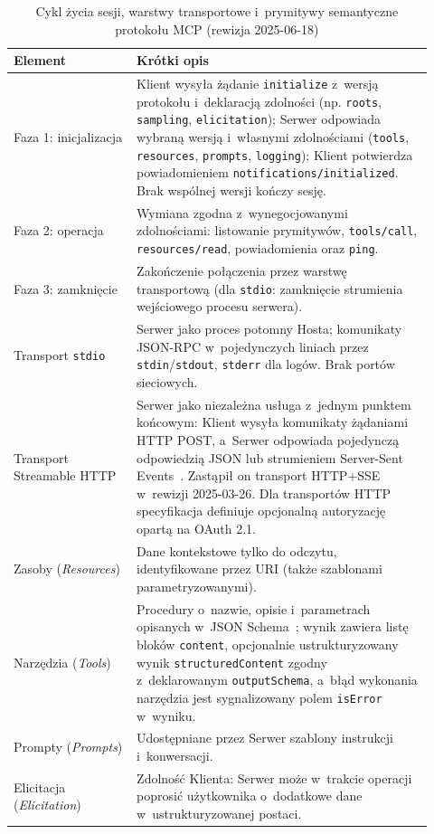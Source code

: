 \begin{table}[htbp]
\centering
\small
\caption{Cykl życia sesji, warstwy transportowe i~prymitywy semantyczne protokołu MCP (rewizja 2025-06-18)}
\label{tab:mcp_sesja_transport_prymitywy}
\begin{tabular}{>{\raggedright\arraybackslash}p{0.27\linewidth} >{\raggedright\arraybackslash}p{0.65\linewidth}}
\toprule
\textbf{Element} & \textbf{Krótki opis} \\
\midrule
Faza 1: inicjalizacja & Klient wysyła żądanie \texttt{initialize} z~wersją protokołu i~deklaracją zdolności (np. \texttt{roots}, \texttt{sampling}, \texttt{elicitation}); Serwer odpowiada wybraną wersją i~własnymi zdolnościami (\texttt{tools}, \texttt{resources}, \texttt{prompts}, \texttt{logging}); Klient potwierdza powiadomieniem \texttt{notifications/initialized}. Brak wspólnej wersji kończy sesję. \\
Faza 2: operacja & Wymiana zgodna z~wynegocjowanymi zdolnościami: listowanie prymitywów, \texttt{tools/call}, \texttt{resources/read}, powiadomienia oraz \texttt{ping}. \\
Faza 3: zamknięcie & Zakończenie połączenia przez warstwę transportową (dla \texttt{stdio}: zamknięcie strumienia wejściowego procesu serwera). \\
\midrule
Transport \texttt{stdio} & Serwer jako proces potomny Hosta; komunikaty JSON-RPC w~pojedynczych liniach przez \texttt{stdin}/\texttt{stdout}, \texttt{stderr} dla logów. Brak portów sieciowych. \\
Transport Streamable HTTP & Serwer jako niezależna usługa z~jednym punktem końcowym: Klient wysyła komunikaty żądaniami HTTP POST, a~Serwer odpowiada pojedynczą odpowiedzią JSON lub strumieniem Server-Sent Events~\cite{w3c_sse}. Zastąpił on transport HTTP+SSE w~rewizji 2025-03-26. Dla transportów HTTP specyfikacja definiuje opcjonalną autoryzację opartą na OAuth 2.1. \\
\midrule
Zasoby (\emph{Resources}) & Dane kontekstowe tylko do odczytu, identyfikowane przez URI (także szablonami parametryzowanymi). \\
Narzędzia (\emph{Tools}) & Procedury o~nazwie, opisie i~parametrach opisanych w~JSON Schema~\cite{json_schema}; wynik zawiera listę bloków \texttt{content}, opcjonalnie ustrukturyzowany wynik \texttt{structuredContent} zgodny z~deklarowanym \texttt{outputSchema}, a~błąd wykonania narzędzia jest sygnalizowany polem \texttt{isError} w~wyniku. \\
Prompty (\emph{Prompts}) & Udostępniane przez Serwer szablony instrukcji i~konwersacji. \\
Elicitacja (\emph{Elicitation}) & Zdolność Klienta: Serwer może w~trakcie operacji poprosić użytkownika o~dodatkowe dane w~ustrukturyzowanej postaci. \\
\bottomrule
\end{tabular}
\end{table}

